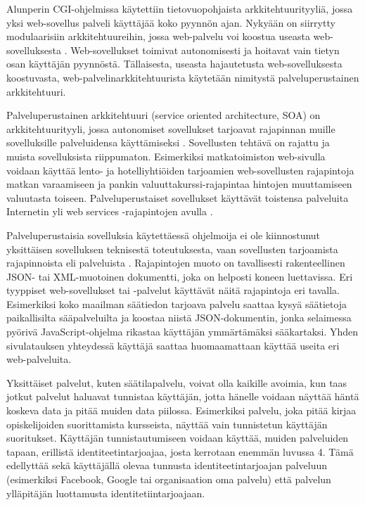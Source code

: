 Alunperin CGI-ohjelmissa käytettiin tietovuopohjaista arkkitehtuurityyliä, jossa yksi web-sovellus palveli käyttäjää koko pyynnön ajan. Nykyään on siirrytty modulaarisiin arkkitehtuureihin, jossa web-palvelu voi koostua useasta web-sovelluksesta \cite{soa}. Web-sovellukset toimivat autonomisesti ja hoitavat vain tietyn osan käyttäjän pyynnöstä. Tällaisesta, useasta hajautetusta web-sovelluksesta koostuvasta, web-palvelinarkkitehtuurista käytetään nimitystä palveluperustainen arkkitehtuuri.

Palveluperustainen arkkitehtuuri (service oriented architecture, SOA) on arkkitehtuurityyli, jossa autonomiset sovellukset tarjoavat rajapinnan muille sovelluksille palveluidensa käyttämiseksi \cite{soa}. Sovellusten tehtävä on rajattu ja muista sovelluksista riippumaton. Esimerkiksi matkatoimiston web-sivulla voidaan käyttää lento- ja hotelliyhtiöiden tarjoamien web-sovellusten rajapintoja matkan varaamiseen ja pankin valuuttakurssi-rajapintaa hintojen muuttamiseen valuutasta toiseen. Palveluperustaiset sovellukset käyttävät toistensa palveluita Internetin yli web services -rajapintojen avulla \cite{soa}.

Palveluperustaisia sovelluksia käytettäessä ohjelmoija ei ole kiinnostunut yksittäisen sovelluksen teknisestä toteutuksesta, vaan sovellusten tarjoamista rajapinnoista eli palveluista \cite{soa}. Rajapintojen muoto on tavallisesti rakenteellinen JSON- tai XML-muotoinen dokumentti, joka on helposti koneen luettavissa. Eri tyyppiset web-sovellukset tai -palvelut käyttävät näitä rajapintoja eri tavalla. Esimerkiksi koko maailman säätiedon tarjoava palvelu saattaa kysyä säätietoja paikallisilta sääpalveluilta ja koostaa niistä JSON-dokumentin, jonka selaimessa pyörivä JavaScript-ohjelma rikastaa käyttäjän ymmärtämäksi sääkartaksi. Yhden sivulatauksen yhteydessä käyttäjä saattaa huomaamattaan käyttää useita eri web-palveluita.

Yksittäiset palvelut, kuten säätilapalvelu, voivat olla kaikille avoimia, kun taas jotkut palvelut haluavat tunnistaa käyttäjän, jotta hänelle voidaan näyttää häntä koskeva data ja pitää muiden data piilossa. Esimerkiksi palvelu, joka pitää kirjaa opiskelijoiden suorittamista kursseista, näyttää vain tunnistetun käyttäjän suoritukset. Käyttäjän tunnistautumiseen voidaan käyttää, muiden palveluiden tapaan, erillistä identiteetintarjoajaa, josta kerrotaan enemmän luvussa 4. Tämä edellyttää sekä käyttäjällä olevaa tunnusta identiteetintarjoajan palveluun (esimerkiksi Facebook, Google tai organisaation oma palvelu) että palvelun ylläpitäjän luottamusta identitetiintarjoajaan.